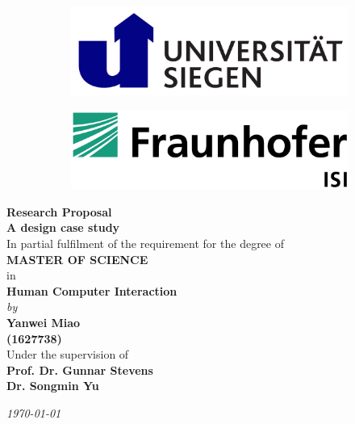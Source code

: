 \begin{titlepage}

\begin{center}

\vspace*{-1cm}

\begin{figure}[h]
  \begin{subfigure}{0.5\textwidth}
  \includegraphics[width=0.8\linewidth, left]{Images/siegen.png} 
  \label{fig:subim1}
  \end{subfigure}
  \begin{subfigure}{0.5\textwidth}
  \includegraphics[width=0.8\linewidth, right]{Images/isi.jpeg}
  \label{fig:subim1}
  \end{subfigure}
\end{figure}

\vfill

\textbf{\large Research Proposal}\\[10pt]
{\Large \bf A design case study}\\

\vfill
In partial fulfilment of the requirement for the degree of\\
{\large \bf MASTER OF SCIENCE}\\
in\\ 
{\large \bf Human Computer Interaction } \\
{\em  by} \\
{\large \bf Yanwei Miao} \\
{\large \bf (1627738)}\\

Under the supervision of \\
{\bf\large Prof. Dr. Gunnar Stevens} \\
{\bf\large Dr. Songmin Yu} \\

\vfill

{\it\large \today}

\end{center}

\end{titlepage}

\clearpage
